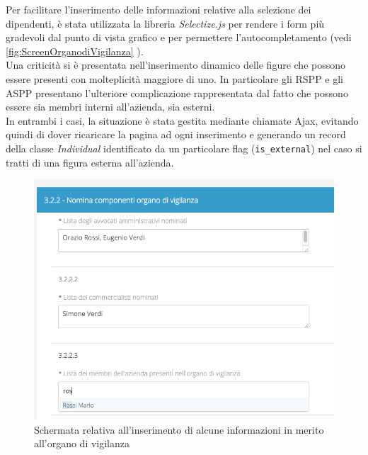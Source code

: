 	Per facilitare l'inserimento delle informazioni relative alla selezione dei dipendenti, è stata utilizzata la libreria \textit{Selectize.js} per rendere i form più gradevoli dal punto di vista grafico e per permettere l'autocompletamento (vedi \autoref{fig:ScreenOrganodiVigilanza} ). \\ 
	Una criticità si è presentata nell'inserimento dinamico delle figure che possono essere presenti con molteplicità maggiore di uno. In particolare gli RSPP e gli ASPP presentano l'ulteriore complicazione rappresentata dal fatto che possono essere sia membri interni all'azienda, sia esterni. \\
	In entrambi i casi, la situazione è stata gestita mediante chiamate \gls{Ajax}, evitando quindi di dover ricaricare la pagina ad ogni inserimento e generando un record della classe \textit{Individual}  identificato da un particolare flag (\texttt{is\_external}) nel caso si tratti di una figura esterna all'azienda.\\
	\newpage
	\begin{figure}[H]
		\begin{center}
			\includegraphics[width=12cm]{Pics/screen_organo_di_vigianza_con_autocompletamento.png}
			\caption{
				Schermata relativa all'inserimento di alcune informazioni in merito all'organo di vigilanza}
			\label{fig:ScreenOrganodiVigilanza}
		\end{center}
	\end{figure}
	
